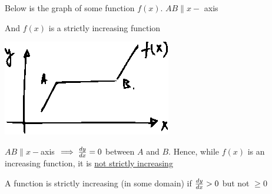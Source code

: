 \documentclass[14pt,fleqn]{extarticle}
\begin{document}
 
\begin{snippet}
    
    \incorrect
    
    Below is the graph of some function $f(x)$. $AB \parallel x-$ axis\newline 
    
    And $f(x)$ is a strictly increasing function 
    
    \begin{center}
\includegraphics[scale=1.5]{figure.eps}
\end{center}
    \reason
    
    $AB \parallel x-$axis $\implies \frac{dy}{dx} = 0$ between $A$ and $B$. Hence, while $f(x)$ is an increasing function, it is \underline{not strictly increasing}\newline 
    
    A function is strictly increasing (in some domain) if $\frac{dy}{dx} > 0$ but not $\geq 0$ 
    
\end{snippet} 
\end{document}
